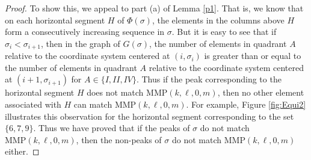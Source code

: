\documentclass[
final,nomarks
]{dmtcs-episciences}
\newcommand{\fref}[1]{Figure \ref{fig:#1}}
\newcommand{\MMP}{\mathrm{MMP}}
\begin{document}
\begin{proof}
	To show this, we appeal to part (a) of Lemma \ref{p1}. That is, we know that 
	on each horizontal segment \begin{math}H\end{math} of \begin{math}\Phi(\sigma)\end{math}, the elements in the columns 
	above \begin{math}H\end{math} form a consecutively increasing sequence in \begin{math}\sigma\end{math}. But it is 
	easy to see that if \begin{math}\sigma_i < \sigma_{i+1}\end{math}, then in the graph of \begin{math}G(\sigma)\end{math}, 
	the number of elements in quadrant \begin{math}A\end{math} relative to the coordinate system centered 
	at \begin{math}(i,\sigma_i)\end{math} is greater than or equal to the number of 
	elements in quadrant \begin{math}A\end{math} relative to the coordinate system centered 
	at \begin{math}(i+1,\sigma_{i+1})\end{math} for \begin{math}A \in \{I,II,IV\}\end{math}.  Thus if the peak corresponding 
	to the horizontal segment \begin{math}H\end{math} does not match \begin{math}\MMP(k,\ell,0,m)\end{math}, then no other 
	element associated with \begin{math}H\end{math} can match \begin{math}\MMP(k,\ell,0,m)\end{math}.
	For example, \fref{Equi2} illustrates this observation for the horizontal segment 
	corresponding to the set \begin{math}\{6,7,9\}\end{math}.
	Thus we have proved that if the peaks of \begin{math}\sigma\end{math} do not match \begin{math}\MMP(k,\ell,0,m)\end{math}, then the non-peaks of \begin{math}\sigma\end{math} do not match \begin{math}\MMP(k,\ell,0,m)\end{math} either.
	

\end{proof}
\end{document}
